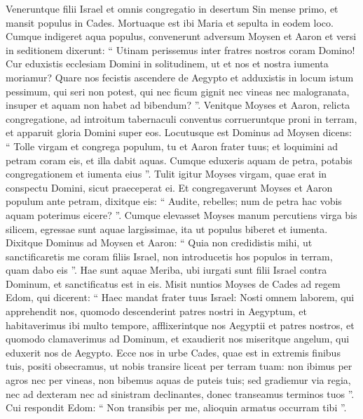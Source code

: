\begin{biblechapter}
\begin{biblechapter}
\begin{biblechapter}
\begin{biblechapter}
\begin{biblechapter}
\begin{biblechapter}
\begin{biblechapter}
\begin{biblechapter}
\begin{biblechapter}
\begin{biblechapter}
\begin{biblechapter}
\begin{biblechapter}
\begin{biblechapter}
\begin{biblechapter}
\begin{biblechapter}
\begin{biblechapter}
\begin{biblechapter}
\begin{biblechapter}
\begin{biblechapter}
\begin{biblechapter}
\verse Veneruntque filii Israel et omnis congregatio in desertum Sin mense primo, et mansit populus in Cades. Mortuaque est ibi Maria et sepulta in eodem loco.
 \verse Cumque indigeret aqua populus, convenerunt adversum Moysen et Aaron 
\verse et versi in seditionem dixerunt: “ Utinam perissemus inter fratres nostros coram Domino! 
\verse Cur eduxistis ecclesiam Domini in solitudinem, ut et nos et nostra iumenta moriamur? 
\verse Quare nos fecistis ascendere de Aegypto et adduxistis in locum istum pessimum, qui seri non potest, qui nec ficum gignit nec vineas nec malogranata, insuper et aquam non habet ad bibendum? ”.
 \verse Venitque Moyses et Aaron, relicta congregatione, ad introitum tabernaculi conventus corrueruntque proni in terram, et apparuit gloria Domini super eos. 
 \verse Locutusque est Dominus ad Moysen dicens: 
\verse “ Tolle virgam et congrega populum, tu et Aaron frater tuus; et loquimini ad petram coram eis, et illa dabit aquas. Cumque eduxeris aquam de petra, potabis congregationem et iumenta eius ”.
 \verse Tulit igitur Moyses virgam, quae erat in conspectu Domini, sicut praeceperat ei. 
\verse Et congregaverunt Moyses et Aaron populum ante petram, dixitque eis: “ Audite, rebelles; num de petra hac vobis aquam poterimus eicere? ”. 
\verse Cumque elevasset Moyses manum percutiens virga bis silicem, egressae sunt aquae largissimae, ita ut populus biberet et iumenta.
 \verse Dixitque Dominus ad Moysen et Aaron: “ Quia non credidistis mihi, ut sanctificaretis me coram filiis Israel, non introducetis hos populos in terram, quam dabo eis ”. 
\verse Hae sunt aquae Meriba, ubi iurgati sunt filii Israel contra Dominum, et sanctificatus est in eis.
 \verse Misit nuntios Moyses de Cades ad regem Edom, qui dicerent: “ Haec mandat frater tuus Israel: Nosti omnem laborem, qui apprehendit nos, 
\verse quomodo descenderint patres nostri in Aegyptum, et habitaverimus ibi multo tempore, afflixerintque nos Aegyptii et patres nostros, 
\verse et quomodo clamaverimus ad Dominum, et exaudierit nos miseritque angelum, qui eduxerit nos de Aegypto. Ecce nos in urbe Cades, quae est in extremis finibus tuis, positi 
\verse obsecramus, ut nobis transire liceat per terram tuam: non ibimus per agros nec per vineas, non bibemus aquas de puteis tuis; sed gradiemur via regia, nec ad dexteram nec ad sinistram declinantes, donec transeamus terminos tuos ”. 
\verse Cui respondit Edom: “ Non transibis per me, alioquin armatus occurram tibi ”. 

\end{biblechapter}
\end{biblechapter}
\end{biblechapter}
\end{biblechapter}
\end{biblechapter}
\end{biblechapter}
\end{biblechapter}
\end{biblechapter}
\end{biblechapter}
\end{biblechapter}
\end{biblechapter}
\end{biblechapter}
\end{biblechapter}
\end{biblechapter}
\end{biblechapter}
\end{biblechapter}
\end{biblechapter}
\end{biblechapter}
\end{biblechapter}
\end{biblechapter}
